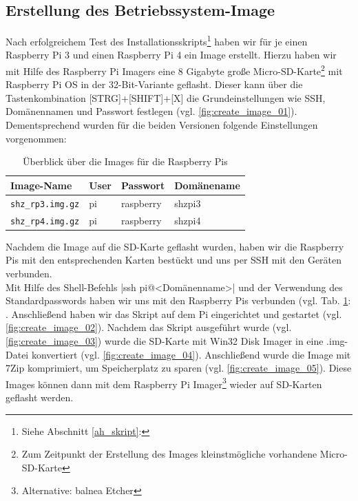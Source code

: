 \subsection{Erstellung des Betriebssystem-Image}\label{sw_image}
Nach erfolgreichem Test des Installationsskripts\footnote{Siehe Abschnitt \ref{ah_skript}: } haben wir für je einen Raspberry Pi 3 und einen Raspberry Pi 4 ein Image erstellt.
Hierzu haben wir mit Hilfe des Raspberry Pi Imagers eine 8 Gigabyte große Micro-SD-Karte\footnote{Zum Zeitpunkt der Erstellung des Images kleinstmögliche vorhandene Micro-SD-Karte} mit Raspberry Pi OS in der 32-Bit-Variante geflasht. 
Dieser kann über die Tastenkombination [STRG]+[SHIFT]+[X] die Grundeinstellungen wie SSH, Domänennamen und Passwort festlegen (vgl. \ref{fig:create_image_01}).
Dementsprechend wurden für die beiden Versionen folgende Einstellungen vorgenommen:\\
\begin{table}[H]
    \begin{tabularx}{\textwidth}{|p{3cm}|p{3cm}|p{4cm}|p{3.7cm}|}
        \hline
        \textbf{Image-Name} & \textbf{User} & \textbf{Passwort} & \textbf{Domänename} \\
        \hline
        \verb|shz_rp3.img.gz| & pi & raspberry & shzpi3\\
        \hline
        \verb|shz_rp4.img.gz| & pi & raspberry & shzpi4\\
        \hline
    \end{tabularx}
    \caption{Überblick über die Images für die Raspberry Pis}
    \label{tab:image_uebersicht}
\end{table}
\noindent Nachdem die Image auf die SD-Karte geflasht wurden, haben wir die Raspberry Pis mit den entsprechenden Karten bestückt und uns per SSH mit den Geräten verbunden.\\
\noindent Mit Hilfe des Shell-Befehls
|ssh pi@<Domänenname>|
\noindent und der Verwendung des Standardpasswords haben wir uns mit den Raspberry Pis verbunden (vgl. Tab. \ref{tab:image_uebersicht}: .
Anschließend haben wir das Skript auf dem Pi eingerichtet und gestartet (vgl. \ref{fig:create_image_02}).
Nachdem das Skript ausgeführt wurde (vgl. \ref{fig:create_image_03}) wurde die SD-Karte mit Win32 Disk Imager in eine .img-Datei konvertiert (vgl. \ref{fig:create_image_04}).
Anschließend wurde die Image mit 7Zip komprimiert, um Speicherplatz zu sparen (vgl. \ref{fig:create_image_05}). Diese Images können dann mit dem Raspberry Pi Imager\footnote{Alternative: balnea Etcher} wieder auf SD-Karten geflasht werden.\\
